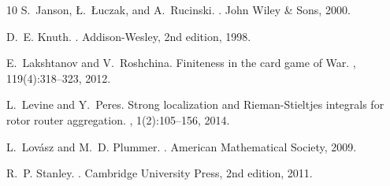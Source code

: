 \documentclass[12pt]{article}
\begin{document}
\begin{thebibliography}{10}
S.~Janson, \L.~\L uczak, and A.~Rucinski.
.
\newblock John Wiley \& Sons, 2000.

D.~E. Knuth.
.
\newblock Addison-Wesley, 2nd edition, 1998.

E.~Lakshtanov and V.~Roshchina.
\newblock Finiteness in the card game of War.
, 119(4):318--323, 2012.

L.~Levine and Y.~Peres.
\newblock Strong localization and Rieman-Stieltjes integrals for rotor router aggregation.
, 1(2):105--156, 2014.

L.~Lov\'{a}sz and M.~D. Plummer.
.
\newblock American Mathematical Society, 2009.

R.~P. Stanley.
.
\newblock Cambridge University Press, 2nd edition, 2011.

\end{thebibliography}
\end{document}
